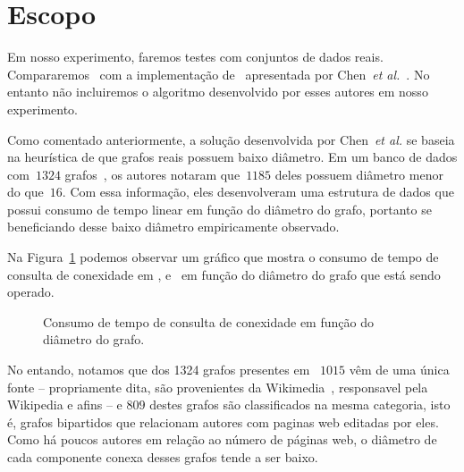 \section{Escopo}

Em nosso experimento, faremos testes com conjuntos de dados reais.
Compararemos~\HDT{} com a implementação de~\HK{} apresentada por Chen~\textit{et al.}~\cite{QC22}.
No entanto não incluiremos o algoritmo desenvolvido por esses autores em nosso experimento.

Como comentado anteriormente, a solução desenvolvida por Chen~\textit{et al.} se baseia na heurística de que grafos reais possuem baixo diâmetro.
Em um banco de dados com~$1324$ grafos~\cite{KONECT}, os autores notaram que~$1185$ deles possuem diâmetro menor do que~$16$.
Com essa informação, eles desenvolveram uma estrutura de dados que possui consumo de tempo linear em função do diâmetro do grafo,
portanto se beneficiando desse baixo diâmetro empiricamente observado.

Na Figura~\ref{fig:sensibilidade-diametro} podemos observar um gráfico que mostra o consumo de tempo de consulta de conexidade em \HK{}, \HDT{} e~\CLHB{} em função do diâmetro do grafo que está sendo operado.

\begin{figure}
\caption{Consumo de tempo de consulta de conexidade em função do diâmetro do grafo.}
\label{fig:sensibilidade-diametro}
\end{figure}

No entando, notamos que dos 1324 grafos presentes em~\cite{KONECT} $1015$ vêm de uma única fonte -- 
propriamente dita, são provenientes da Wikimedia~\cite{wikimedia}, responsavel pela Wikipedia e afins -- 
e $809$ destes grafos são classificados na mesma categoria, isto é, grafos bipartidos que relacionam autores com paginas web editadas por eles. Como há poucos autores em relação ao número de páginas web, o diâmetro de cada componente conexa desses grafos tende a ser baixo.


